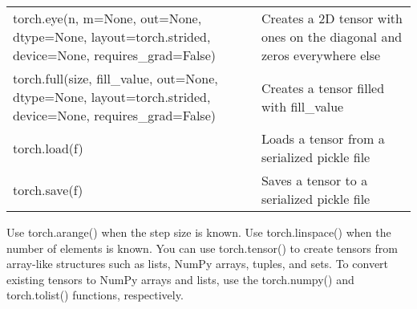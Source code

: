 \begin{table}
\begin{tabularx}{\textwidth}{XX}
        \textsf{torch.eye(n, m=None, out=None, dtype=None, layout=torch.strided, device=None, requires\_grad=False)}                             & Creates a 2D tensor with ones on the diagonal and zeros everywhere else                    \\
        \textsf{torch.full(size, fill\_value, out=None, dtype=None, layout=torch.strided, device=None, requires\_grad=False)}                    & Creates a tensor filled with fill\_value                                                   \\
        \textsf{torch.load(f)}                                                                                                                   & Loads a tensor from a serialized pickle file                                               \\
        \textsf{torch.save(f)}                                                                                                                   & Saves a tensor to a serialized pickle file                                                 \\
        \hline
    \end{tabularx}
\end{table}

Use \textsf{torch.arange()} when the step size is known. Use \textsf{torch.linspace()} when the number of elements is known. You can use \textsf{torch.tensor()} to create tensors from array-like structures such as lists, NumPy arrays, tuples, and
sets. To convert existing tensors to NumPy arrays and lists,
use the \textsf{torch.numpy()} and \textsf{torch.tolist()} functions,
respectively.